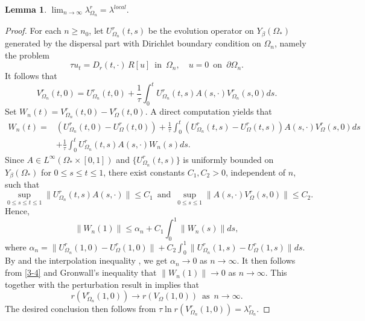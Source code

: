 \documentclass[11pt,reqno]{amsart}
\newtheorem{lemma}[theorem]{Lemma}
\numberwithin{equation}{section}
\begin{document}
\begin{lemma}\label{LEM3.3}
$\lim_{n\to\infty} \lambda^{r}_{\Omega_{n}} = \lambda^{local}.$
\end{lemma}
%
%
\begin{proof}
For each $n\geq n_{0}$, let $U^{r}_{\Omega_{n}}(t,s)$ be the evolution operator on $Y_{\beta}(\Omega_{*})$ generated by the dispersal part
with Dirichlet boundary condition on $\Omega_n$, namely the problem
\begin{equation*}
\tau u_t = D_r(t,\cdot)\,R[u]
\enspace \text{in} \enspace \Omega_n,
\quad u=0 \enspace\text{on}\enspace \partial\Omega_n.
\end{equation*}
It follows that
\begin{equation*}
V_{\Omega_n}^r(t,0) = U_{\Omega_n}^{r}(t,0) +  \frac{1}{\tau}\int_0^t U_{\Omega_n}^{r}(t,s) A(s,\cdot) V_{\Omega_n}^r(s,0) ds.
\end{equation*}
Set $W_{n}(t) = V_{\Omega_n}^r(t,0) - V_{\Omega}^r(t,0)$. A direct computation yields that
\begin{align*}
W_{n}(t) = &\left( U^{r}_{\Omega_n}(t,0)-U^{r}_{\Omega}(t,0) \right) + \frac{1}{\tau}\int_{0}^{t} \left( U^{r}_{\Omega_n}(t,s)-U^{r}_{\Omega}(t,s) \right)A(s,\cdot) V_{\Omega}^{r}(s,0)ds \\
&+ \frac{1}{\tau}\int_{0}^{t} U^{r}_{\Omega_n}(t,s) A(s,\cdot) W_{n}(s) ds.
\end{align*}
Since $A\in L^{\infty}(\Omega_{*} \times [0,1])$ and $\{U^{r}_{\Omega_n}(t,s)\}$ is uniformly bounded on $Y_{\beta}(\Omega_{*})$ for $0\le s\le t\le 1$,
there exist constants $C_{1},C_{2}>0$, independent of $n$, such that
\begin{equation*}
\sup_{0\leq s \leq t \leq 1} \| U_{\Omega_{n}}^{r}(t,s)A(s,\cdot) \|\leq C_{1}
\enspace \text{and} \enspace
\sup_{0\leq s \leq 1} \| A(s,\cdot)V_{\Omega}^{r}(s,0) \|\leq C_{2}.
\end{equation*}
Hence,
\begin{equation}\label{3-4}
\| W_{n}(1) \| \leq  \alpha_{n} + C_{1} \int_{0}^{1}  \| W_{n}(s)\| ds,
\end{equation}
where $\alpha_{n} = \| U^{r}_{\Omega_n}(1,0)-U^{r}_{\Omega}(1,0) \| +  C_{2}\int_{0}^{1}  \| U^{r}_{\Omega_n}(1,s)-U^{r}_{\Omega}(1,s) \|ds$. By \cite[Remark 4.5]{Dan} and the interpolation inequality \cite[Proposition 1.2.6]{lun}, we get $\alpha_{n}\to 0$ as $n\to\infty$. It then follows from \eqref{3-4} and Gronwall's inequality that
$\| W_{n}(1) \|\to 0$ as $n\to\infty$. This together with the perturbation result in \cite[Section IV. 3.5]{Kato} implies that
\begin{equation*}
r(V_{\Omega_{n}}^{r}(1,0)) \to r(V_{\Omega}(1,0))
\enspace \text{as} \enspace
n\to\infty.
\end{equation*}
The desired conclusion then follows from
$\tau \ln r(V^{r}_{\Omega_{n}}(1,0)) = \lambda^{r}_{\Omega_{n}}$.
\end{proof}
%
%
\end{document}
